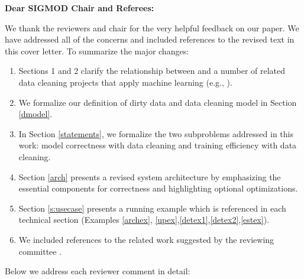 {\noindent \normalsize \bf Dear SIGMOD Chair and Referees: }

\vspace{.5em}

We thank the reviewers and chair for the very helpful feedback on our paper. 
We have addressed all of the concerns and included references to the revised text in this cover letter. 
To summarize the major changes:

\begin{enumerate}
\item Sections 1 and 2 clarify the relationship between \sys and a number of related data cleaning projects that apply machine learning (e.g., \cite{gokhale2014corleone, DBLP:journals/pvldb/YakoutENOI11, yakout2013don}).

\item We formalize our definition of dirty data and data cleaning model in Section \ref{dmodel}.

\item In Section \ref{statements}, we formalize the two subproblems addressed in this work: model correctness with data cleaning and training efficiency with data cleaning.

\item Section \ref{arch} presents a revised system architecture by emphasizing the essential components for correctness and highlighting optional optimizations. 

\item Section \ref{s:usecase} presents a running example which is referenced in each technical section (Examples \ref{archex}, \ref{upex},\ref{detex1},\ref{detex2},\ref{estex}).

\item We included references to the related work suggested by the reviewing committee \cite{whang2014incremental, papenbrock2015progressive, gruenheid2014incremental, DBLP:journals/pvldb/YakoutENOI11, yakout2013don, heise2014estimating}.

\end{enumerate}
Below we address each reviewer comment in detail:

\vspace{0.5em}

